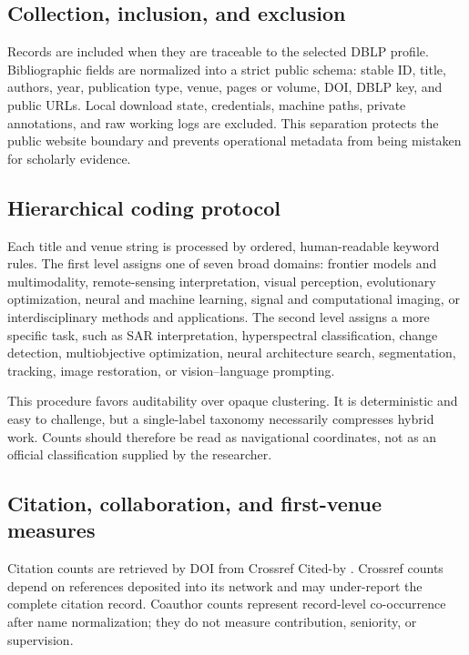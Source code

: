 \documentclass[11pt]{article}
\begin{document}
\subsection{Collection, inclusion, and exclusion}

Records are included when they are traceable to the selected DBLP profile.
Bibliographic fields are normalized into a strict public schema: stable ID,
title, authors, year, publication type, venue, pages or volume, DOI, DBLP key,
and public URLs. Local download state, credentials, machine paths, private
annotations, and raw working logs are excluded. This separation protects the
public website boundary and prevents operational metadata from being mistaken
for scholarly evidence.

\subsection{Hierarchical coding protocol}

Each title and venue string is processed by ordered, human-readable keyword
rules. The first level assigns one of seven broad domains: frontier models and
multimodality, remote-sensing interpretation, visual perception, evolutionary
optimization, neural and machine learning, signal and computational imaging,
or interdisciplinary methods and applications. The second level assigns a
more specific task, such as SAR interpretation, hyperspectral classification,
change detection, multiobjective optimization, neural architecture search,
segmentation, tracking, image restoration, or vision--language prompting.

This procedure favors auditability over opaque clustering. It is deterministic
and easy to challenge, but a single-label taxonomy necessarily compresses
hybrid work. Counts should therefore be read as navigational coordinates, not
as an official classification supplied by the researcher.

\subsection{Citation, collaboration, and first-venue measures}

Citation counts are retrieved by DOI from Crossref Cited-by
\cite{crossref-citedby}. Crossref counts depend on references deposited into
its network and may under-report the complete citation record. Coauthor counts
represent record-level co-occurrence after name normalization; they do not
measure contribution, seniority, or supervision.
\end{document}
